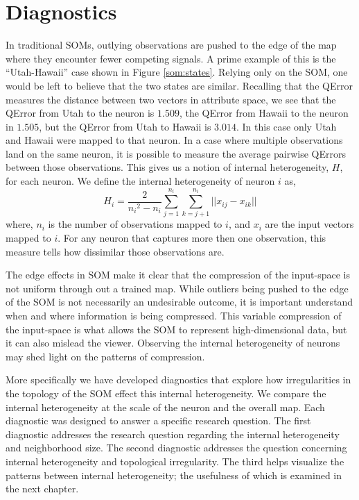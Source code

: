 \section{Diagnostics}
\label{meth:diag}
In traditional SOMs, outlying observations are pushed to the edge of the map
where they encounter fewer competing signals.  A prime example of this is the
``Utah-Hawaii'' case shown in Figure \ref{som:states}.  Relying only on the
SOM, one would be left to believe that the two states are similar.  Recalling
that the QError measures the distance between two vectors in attribute space,
we see that the QError from Utah to the neuron is $1.509$, the QError from
Hawaii to the neuron in $1.505$, but the QError from Utah to Hawaii is
$3.014$. In this case only Utah and Hawaii were mapped to that neuron.  In a
case where multiple observations land on the same neuron, it is possible to
measure the average pairwise QErrors between those observations.  This gives us a
notion of internal heterogeneity, \(H\), for each neuron.  We define the
internal heterogeneity of neuron \(i\) as,
 \begin{equation}
   {H_i} = \frac{2}{{n_i}^2-{n_i}}\sum_{j=1}^{n_i}\sum_{k=j+1}^{n_i} ||{x_{ij}}-{x_{ik}}||
 \label{eqno1}
 \end{equation}
where, \(n_i\) is the number of observations mapped to \(i\), and \(x_i\) are
the input vectors mapped to \(i\).  For any neuron that captures more then one
observation, this measure tells how dissimilar those observations are.

The edge effects in SOM make it clear that the compression of the input-space is
not uniform through out a trained map.  While outliers being pushed to the edge of
the SOM is not necessarily an undesirable outcome, it is important understand
when and where information is being compressed.  This variable compression of
the input-space is what allows the SOM to represent high-dimensional data, but
it can also mislead the viewer.  Observing the internal heterogeneity of
neurons may shed light on the patterns of compression.  

More specifically we have developed diagnostics that explore how irregularities
in the topology of the SOM effect this internal heterogeneity.  We compare the
internal heterogeneity at the scale of the neuron and the overall map.  Each
diagnostic was designed to answer a specific research question.  The first
diagnostic addresses the research question regarding the internal
heterogeneity and neighborhood size.  The second diagnostic addresses the
question concerning internal heterogeneity and topological irregularity.  The
third helps visualize the patterns between internal heterogeneity; the
usefulness of which is examined in the next chapter.

